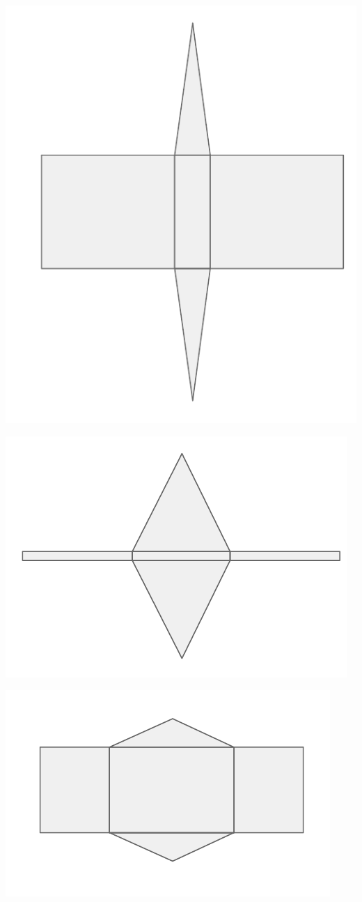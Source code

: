 \documentclass[a4paper,11pt]{report}
\begin{document}
\begin{exop}
{\begin{tasks}
	\includegraphics[scale=0.4]{media/es-20/pt217867}
		\task

	\includegraphics[scale=0.4]{media/es-20/pt555505}
		\task

	\includegraphics[scale=0.4]{media/es-20/pt701648}
		\task


\end{tasks}}
\end{exop}
\end{document}
